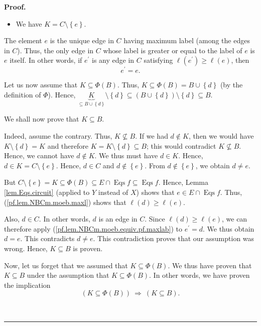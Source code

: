 \documentclass[numbers=enddot,12pt,final,onecolumn,notitlepage]{scrartcl}%
\theoremstyle{definition}
\newenvironment{proof}[1][Proof]{\noindent\textbf{#1.} }{\ \rule{0.5em}{0.5em}}
\newenvironment{verlong}{}{}
\begin{document}
\begin{verlong}
\begin{proof}
\begin{itemize}
\item We have $K=C\setminus\left\{  e\right\}  $.
\end{itemize}

The element $e$ is the unique edge in $C$ having maximum label (among
the edges in $C$). Thus, the only edge in $C$ whose label is greater or equal
to the label of $e$ is $e$ itself. In other words, if $e^{\prime}$ is any edge
in $C$ satisfying $\ell\left(  e^{\prime}\right)  \geq\ell\left(  e\right)  $,
then%
\begin{equation}
e^{\prime}=e. \label{pf.lem.NBCm.moeb.equiv.pf.maxlab}%
\end{equation}


Let us now assume that $K\subseteq\Phi\left(  B\right)  $. Thus,
$K\subseteq\Phi\left(  B\right)  =B\cup\left\{  d\right\}  $ (by the
definition of $\Phi$). Hence, $\underbrace{K}_{\subseteq B\cup\left\{
d\right\}  }\setminus\left\{  d\right\}  \subseteq\left(  B\cup\left\{
d\right\}  \right)  \setminus\left\{  d\right\}  \subseteq B$.

We shall now prove that $K\subseteq B$.

Indeed, assume the contrary. Thus, $K\not \subseteq B$. If we had $d\notin K$,
then we would have $K\setminus\left\{  d\right\}  =K$ and therefore
$K=K\setminus\left\{  d\right\}  \subseteq B$; this would contradict
$K\not \subseteq B$. Hence, we cannot have $d\notin K$. We thus must have
$d\in K$. Hence, $d\in K=C\setminus\left\{  e\right\}  $. Hence, $d\in C$ and
$d\notin\left\{  e\right\}  $. From $d\notin\left\{  e\right\}  $, we obtain
$d\neq e$.

But $C\setminus\left\{  e\right\}  =K\subseteq\Phi\left(  B\right)  \subseteq
E\cap\operatorname*{Eqs}f\subseteq\operatorname*{Eqs}f$. Hence, Lemma
\ref{lem.Eqs.circuit} (applied to $Y$ instead of $X$) shows that $e\in
E\cap\operatorname*{Eqs}f$. Thus, (\ref{pf.lem.NBCm.moeb.maxl}) shows that
$\ell\left(  d\right)  \geq\ell\left(  e\right)  $.

Also, $d\in C$. In other words, $d$ is an edge in $C$. Since $\ell\left(
d\right)  \geq\ell\left(  e\right)  $, we can therefore apply
(\ref{pf.lem.NBCm.moeb.equiv.pf.maxlab}) to $e^{\prime}=d$. We thus obtain
$d=e$. This contradicts $d\neq e$. This contradiction proves that our
assumption was wrong. Hence, $K\subseteq B$ is proven.

Now, let us forget that we assumed that $K\subseteq\Phi\left(  B\right)  $. We
thus have proven that $K\subseteq B$ under the assumption that $K\subseteq
\Phi\left(  B\right)  $. In other words, we have proven the implication%
\begin{equation}
\left(  K\subseteq\Phi\left(  B\right)  \right)  \ \Longrightarrow\ \left(
K\subseteq B\right)  . \label{pf.lem.NBCm.moeb.equiv.pf.dir1}%
\end{equation}



\end{proof}
\end{verlong}
\end{document}
